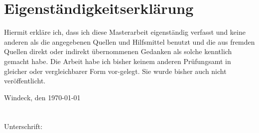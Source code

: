 \section{Eigenständigkeitserklärung}

\vspace*{\fill}

Hiermit erkläre ich, dass ich diese Masterarbeit eigenständig verfasst und
keine anderen als die angegebenen Quellen und Hilfsmittel benutzt und die aus
fremden Quellen direkt oder indirekt übernommenen Gedanken als solche kenntlich 
gemacht habe. Die Arbeit habe ich bisher keinem anderen Prüfungsamt in gleicher
oder vergleichbarer Form vor-gelegt. Sie wurde bisher auch nicht veröffentlicht.

Windeck, den \today
\\
\\
\\
Unterschrift: \hrulefill

\vspace*{\fill}